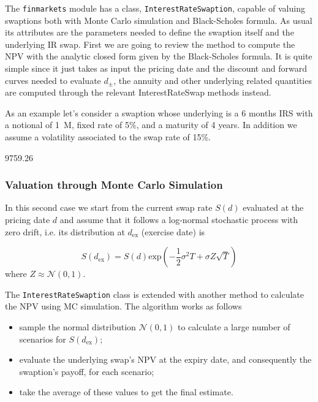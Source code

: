 \begin{finmarkets}
The \texttt{finmarkets} module has a class, \texttt{InterestRateSwaption}, capable of valuing swaptions both with Monte Carlo simulation and Black-Scholes formula. As usual its attributes are the parameters needed to define the swaption itself and the underlying IR swap. First we are going to review the method to compute the NPV with the analytic closed form given by the Black-Scholes formula. It is quite simple since it just takes as input the pricing date and the discount and forward curves needed to evaluate $d_{\pm}$, the annuity and other underlying related quantities are computed through the relevant InterestRateSwap methods instead.
\end{finmarkets}


As an example let's consider a swaption whose underlying is a 6 months IRS with a notional of 1~M, fixed rate of 5\%, and a maturity of 4 years. In addition we assume a volatility associated to the swap rate of 15\%.


\begin{ioutput}
9759.26
\end{ioutput}

\subsubsection{Valuation through Monte Carlo Simulation}
\label{evaluation-through-monte-carlo-simulation}

In this second case we start from the current swap rate $S(d)$ evaluated at the pricing date $d$ and assume that it follows a log-normal stochastic process with zero drift, i.e. its distribution at $d_{\mathrm{ex}}$ (exercise date) is 

\begin{equation*}
S(d_{\mathrm{ex}}) = S(d)\mathrm{exp}(-\frac{1}{2}\sigma^{2}T+\sigma Z\sqrt{T})
\end{equation*}
\noindent
where $Z\approx\mathcal{N}(0,1)$. %

\begin{finmarkets}
The \texttt{InterestRateSwaption} class is extended with another method to calculate the NPV using MC simulation. The algorithm works as follows

\begin{itemize}
\tightlist
\item sample the normal distribution $\mathcal{N}(0, 1)$ to calculate a large number of scenarios for $S(d_{\mathrm{ex}})$;
\item evaluate the underlying swap's NPV at the expiry date, and consequently the swaption's payoff, for each scenario;
\item take the average of these values to get the final estimate.
\end{itemize}
\end{finmarkets}


